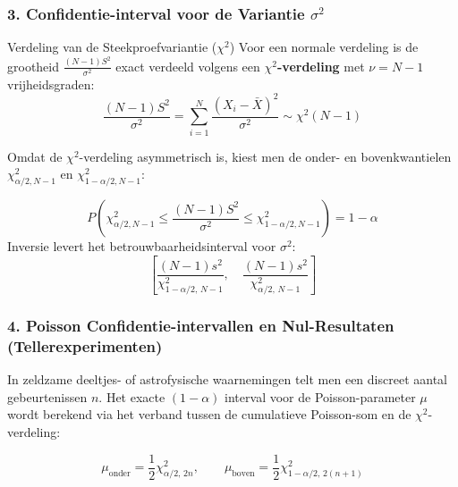 \documentclass[11pt,a4paper]{article}
\begin{document}
\subsubsection{3. Confidentie-interval voor de Variantie \texorpdfstring{$\sigma^2$}{sigma-kwadraat}}
\begin{theobox}{Verdeling van de Steekproefvariantie ($\chi^2$)}
Voor een normale verdeling is de grootheid $\frac{(N - 1)S^2}{\sigma^2}$ exact verdeeld volgens een \textbf{$\chi^2$-verdeling} met $\nu = N - 1$ vrijheidsgraden:
\begin{equation}
    \frac{(N - 1)S^2}{\sigma^2} = \sum_{i=1}^N \frac{(X_i - \bar{X})^2}{\sigma^2} \sim \chi^2(N - 1)
\end{equation}
\end{theobox}
Omdat de $\chi^2$-verdeling asymmetrisch is, kiest men de onder- en bovenkwantielen $\chi^2_{\alpha/2, N-1}$ en $\chi^2_{1 - \alpha/2, N-1}$:
\begin{formulabox}
\begin{equation}
    P\left( \chi^2_{\alpha/2, N-1} \le \frac{(N - 1)S^2}{\sigma^2} \le \chi^2_{1 - \alpha/2, N-1} \right) = 1 - \alpha
\end{equation}
Inversie levert het betrouwbaarheidsinterval voor $\sigma^2$:
\begin{equation}
    \left[ \frac{(N - 1)s^2}{\chi^2_{1 - \alpha/2, \, N - 1}}, \quad \frac{(N - 1)s^2}{\chi^2_{\alpha/2, \, N - 1}} \right]
\end{equation}
\end{formulabox}

\subsubsection{4. Poisson Confidentie-intervallen en Nul-Resultaten (Tellerexperimenten)}
In zeldzame deeltjes- of astrofysische waarnemingen telt men een discreet aantal gebeurtenissen $n$. Het exacte $(1 - \alpha)$ interval voor de Poisson-parameter $\mu$ wordt berekend via het verband tussen de cumulatieve Poisson-som en de $\chi^2$-verdeling:
\begin{formulabox}
\begin{equation}
    \mu_{\text{onder}} = \frac{1}{2} \chi^2_{\alpha/2, \, 2n}, \qquad \mu_{\text{boven}} = \frac{1}{2} \chi^2_{1 - \alpha/2, \, 2(n + 1)}
\end{equation}
\end{formulabox}
\end{document}
